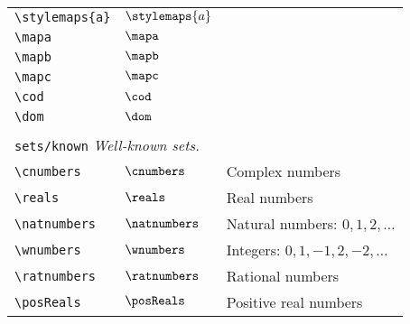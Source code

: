 \begin{longtable}{lll}
  {\color[rgb]{0.5,0.5,0.5}\texttt{\textbackslash stylemaps\{a\}}}                                          & $\stylemaps{a}$
  & \\
  {\color[rgb]{0.5,0.5,0.5}\texttt{\textbackslash mapa}}                                                    & $\mapa$                    & \\
  {\color[rgb]{0.5,0.5,0.5}\texttt{\textbackslash mapb}}                                                    & $\mapb$                    & \\
  {\color[rgb]{0.5,0.5,0.5}\texttt{\textbackslash mapc}}                                                    & $\mapc$                    & \\
  {\color[rgb]{0.5,0.5,0.5}\texttt{\textbackslash cod}}                                                     & $\cod$                     & \\
  {\color[rgb]{0.5,0.5,0.5}\texttt{\textbackslash dom}}                                                     & $\dom$                     &                                                         \\
  &                            &                                                         \\
  \multicolumn{3}{l}{{\color[rgb]{0.5,0.5,0.5}\texttt{sets/known}} \emph{Well-known sets.}}
  \\
  \hline
  {\color[rgb]{0.5,0.5,0.5}\texttt{\textbackslash cnumbers}}                                                & $\cnumbers$                & Complex numbers\\
  {\color[rgb]{0.5,0.5,0.5}\texttt{\textbackslash reals}}                                                   & $\reals$                   & Real numbers\\
  {\color[rgb]{0.5,0.5,0.5}\texttt{\textbackslash natnumbers}}                                              & $\natnumbers$              & Natural numbers: $0, 1, 2, \dots$\\
  {\color[rgb]{0.5,0.5,0.5}\texttt{\textbackslash wnumbers}}                                                & $\wnumbers$                & Integers: $0, 1, -1, 2, -2, \dots$\\
  {\color[rgb]{0.5,0.5,0.5}\texttt{\textbackslash ratnumbers}}                                              & $\ratnumbers$              & Rational numbers\\
  {\color[rgb]{0.5,0.5,0.5}\texttt{\textbackslash posReals}}                                                & $\posReals$                & Positive real numbers\\

\end{longtable}
